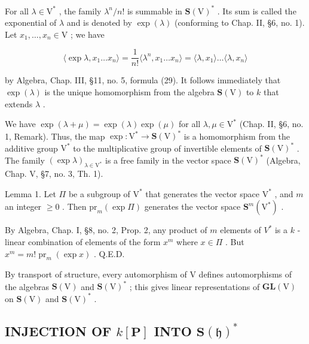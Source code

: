 For all \(\lambda \in \mathrm{V}^*\) , the family \(\lambda^n / n!\) is summable in \(\mathbf{S}(\mathrm{V})^*\) . Its sum is called the exponential of \(\lambda\) and is denoted by \(\exp(\lambda)\) (conforming to Chap. II, §6, no. 1). Let \(x_1, \ldots, x_n \in \mathrm{V}\) ; we have

\[
\langle \exp \lambda , x _ {1} \dots x _ {n} \rangle = \frac {1}{n !} \langle \lambda^ {n}, x _ {1} \dots x _ {n} \rangle = \langle \lambda , x _ {1} \rangle \dots \langle \lambda , x _ {n} \rangle
\]

by Algebra, Chap. III, §11, no. 5, formula (29). It follows immediately that \(\exp(\lambda)\) is the unique homomorphism from the algebra \(\mathbf{S}(\mathrm{V})\) to \(k\) that extends \(\lambda\) .

We have \(\exp (\lambda +\mu) = \exp (\lambda)\exp (\mu)\) for all \(\lambda ,\mu \in \mathrm{V}^{*}\) (Chap. II, §6, no. 1, Remark). Thus, the map \(\exp :\mathrm{V}^{*}\to \mathbf{S}(\mathrm{V})^{*}\) is a homomorphism from the additive group \(\mathrm{V}^*\) to the multiplicative group of invertible elements of \(\mathbf{S}(\mathrm{V})^{*}\) . The family \((\exp \lambda)_{\lambda \in \mathrm{V}^{*}}\) is a free family in the vector space \(\mathbf{S}(\mathrm{V})^{*}\) (Algebra, Chap. V, §7, no. 3, Th. 1).

Lemma 1. Let \(\Pi\) be a subgroup of \(\mathrm{V}^*\) that generates the vector space \(\mathrm{V}^*\) , and \(m\) an integer \(\geq 0\) . Then \(\mathrm{pr}_m(\exp \Pi)\) generates the vector space \(\mathbf{S}^m (\mathrm{V}^*)\) .

By Algebra, Chap. I, §8, no. 2, Prop. 2, any product of \(m\) elements of \(V^{*}\) is a \(k\) -linear combination of elements of the form \(x^{m}\) where \(x \in \Pi\) . But \(x^{m} = m! \operatorname{pr}_{m}(\exp x)\) . Q.E.D.

By transport of structure, every automorphism of V defines automorphisms of the algebras \(\mathbf{S}(\mathrm{V})\) and \(\mathbf{S}(\mathrm{V})^{*}\) ; this gives linear representations of \(\mathbf{GL}(\mathrm{V})\) on \(\mathbf{S}(\mathrm{V})\) and \(\mathbf{S}(\mathrm{V})^{*}\) .

\subsection{\texorpdfstring{INJECTION OF \(k[\mathbf{P}]\) INTO \(\mathbf{S}(\mathfrak{h})^{*}\)}{INJECTION OF k{[}\textbackslash mathbf\{P\}{]} INTO \textbackslash mathbf\{S\}(\textbackslash mathfrak\{h\})\^{}\{*\}}}

